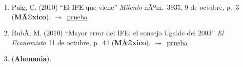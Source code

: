 \documentclass[12 pt, letter]{article}
\newenvironment{CitasMiTrabajo}{
    \begin{footnotesize}
    \begin{enumerate}[label={\footnotesize\emph{cita~\arabic*}},ref=\arabic*] %
        \setlength{\itemsep}{.1\itemsep}
        \setlength{\parskip}{.1\parskip}
    }{\end{enumerate}\end{footnotesize}}
\begin{document}
\begin{CitasMiTrabajo}
        \label{ncites:sanchez.magaloni.magar.2011} %

        
        \end{CitasMiTrabajo}






        \begin{CitasMiTrabajo}

        \item Puig, C. (2010)
        ``El
        IFE que viene'' \emph{Milenio} nÃºm.\ 3935, 9 de octubre, p.~3 (\textbf{MÃ©xico}). $\rightarrow$~\href{http://ericmagar.com/cv/cites/magarEtalIFEDinam/puig.pdf}{prueba}

        \item RubÃ­, M. (2010)
        ``Mayor error del IFE: el consejo Ugalde del 2003'' \emph{El Economista} 11 de octubre, p.~44 (\textbf{MÃ©xico}). $\rightarrow$~\href{http://ericmagar.com/cv/cites/magarEtalIFEDinam/rubi.pdf}{prueba}

        \item {} (\href{http://ericmagar.com/cv/cites/magarEtalIFEDinam/lara2015.pdf}{\textbf{Alemania}}).

        \label{ncites:magar.estevez.rosas.2010} %

        \end{CitasMiTrabajo}
\end{document}
